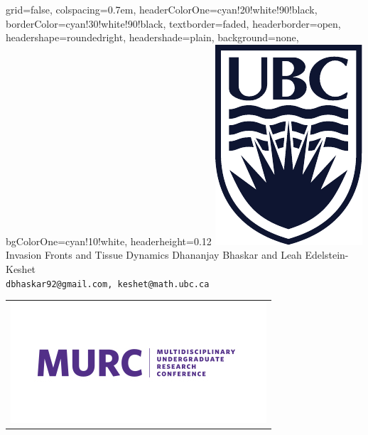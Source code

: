 \documentclass[landscape,a0paper,fontscale=0.292]{baposter}
\begin{document}
\begin{poster}{
 grid=false,
 colspacing=0.7em,
 headerColorOne=cyan!20!white!90!black,
 borderColor=cyan!30!white!90!black,
 textborder=faded,
 headerborder=open,
 headershape=roundedright,
 headershade=plain,
 background=none,
 bgColorOne=cyan!10!white,
 headerheight=0.12\textheight}
 {
      \includegraphics[height=0.10\textheight]{ubclogo}
 }
 {\sc\Huge Invasion Fronts and Tissue Dynamics}
 {Dhananjay Bhaskar and Leah Edelstein-Keshet\\[1em]
 {\texttt{dbhaskar92@gmail.com, keshet@math.ubc.ca}}}
 {
  \begin{tabular}{r}
    \includegraphics[height=0.12\textheight]{murc}
  \end{tabular}
 }



\end{poster}
\end{document}
